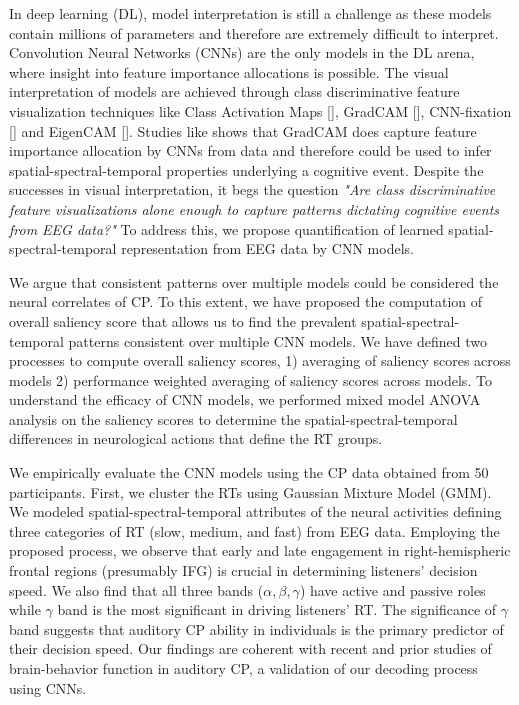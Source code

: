 \documentclass{article}
\begin{document}
In deep learning (DL), model interpretation is still a challenge as these models contain millions of parameters and therefore are extremely difficult to interpret. Convolution Neural Networks (CNNs) are the only models in the DL arena, where insight into feature importance allocations is possible. The visual interpretation of models are achieved through class discriminative feature visualization techniques like Class Activation Maps [\cite{CAM}], GradCAM [\cite{gradcam}], CNN-fixation [\cite{cnn_fixation}] and EigenCAM [\cite{EigenCAM}]. Studies like \cite{eeg_cnn_gradcam, eeg_cnn_gradcam2, eeg_cnn_gradcam3} shows that GradCAM does capture feature importance allocation by CNNs from data and therefore could be used to infer spatial-spectral-temporal properties underlying a cognitive event. Despite the successes in visual interpretation, it begs the question \emph{"Are class discriminative feature visualizations alone enough to capture patterns dictating cognitive events from EEG data?"} To address this, we propose quantification of learned spatial-spectral-temporal representation from EEG data by CNN models.

We argue that consistent patterns over multiple models could be considered the neural correlates of CP. To this extent, we have proposed the computation of overall saliency score that allows us to find the prevalent spatial-spectral-temporal patterns consistent over multiple CNN models. We have defined two processes to compute overall saliency scores, 1) averaging of saliency scores across models 2) performance weighted averaging of saliency scores across models. To understand the efficacy of CNN models, we performed mixed model ANOVA analysis on the saliency scores to determine the spatial-spectral-temporal differences in neurological actions that define the RT groups.

We empirically evaluate the CNN models using the CP data obtained from 50 participants. First, we cluster the RTs using Gaussian Mixture Model (GMM). We modeled spatial-spectral-temporal attributes of the neural activities defining three categories of RT (slow, medium, and fast) from EEG data. Employing the proposed process, we observe that early and late engagement in right-hemispheric frontal regions (presumably IFG) is crucial in determining listeners' decision speed. We also find that all three bands ($\alpha, \beta, \gamma$) have active and passive roles while $\gamma$ band is the most significant in driving listeners' RT. The significance of $\gamma$ band suggests that auditory CP ability in individuals is the primary predictor of their decision speed. Our findings are coherent with recent and prior studies of brain-behavior function in auditory CP, a validation of our decoding process using CNNs.
\end{document}
